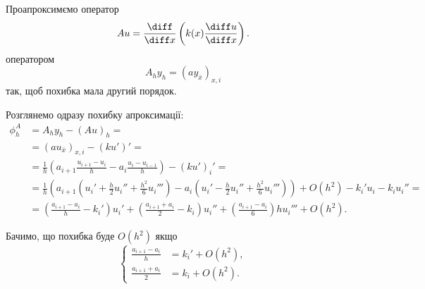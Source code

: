 \begin{example}
    Проапроксимємо оператор
    \begin{equation}
        \label{eq:4.3.8}
        A u = \frac{\diff}{\diff x} \left( k(x) \frac{\diff u}{\diff x} \right).
    \end{equation}
    оператором
    \begin{equation}
        \label{eq:4.3.9}
        A_h y_h = (a y_{\bar x})_{x,i}
    \end{equation}
    так, щоб похибка мала другий порядок.
\end{example}
\begin{solution}
    Розглянемо одразу похибку апроксимації:
    \begin{equation}
        \label{eq:4.3.10}
        \begin{aligned}
            \phi_h^A &= A_h y_h - (A u)_h = \\
            &= (a u_{\bar x})_{x,i} - (k u')' = \\
            &= \frac{1}{h} \left( a_{i + 1}  \frac{u_{i + 1} - u_i}{h} - a_i  \frac{u_i - u_{i - 1}}{h} \right) - (k u')_i' = \\
            &= \frac{1}{h} \left( a_{i + 1}  \left( u_i' + \frac{h}{2} u_i'' + \frac{h^2}{6} u_i''' \right) - a_i  \left( u_i' - \frac{h}{2} u_i'' + \frac{h^2}{6} u_i''' \right) \right) + O(h^2) - k_i' u_i - k_i u_i'' = \\
            &= \left( \frac{a_{i + 1} - a_i}{h} - k_i' \right) u_i' + \left( \frac{a_{i + 1} + a_i}{2} - k_i \right) u_i'' + \left( \frac{a_{i + 1} - a_i}{6} \right) h u_i''' + O(h^2).
        \end{aligned}
    \end{equation}

    Бачимо, що похибка буде $O(h^2)$ якщо
    \begin{equation}
        \label{eq:4.3.11}
        \left\{ 
            \begin{aligned}
                \frac{a_{i + 1} - a_i}{h} &= k_i' + O(h^2), \\
                \frac{a_{i + 1} + a_i}{2} &= k_i + O(h^2).
            \end{aligned}
        \right.
    \end{equation}


\end{solution}
